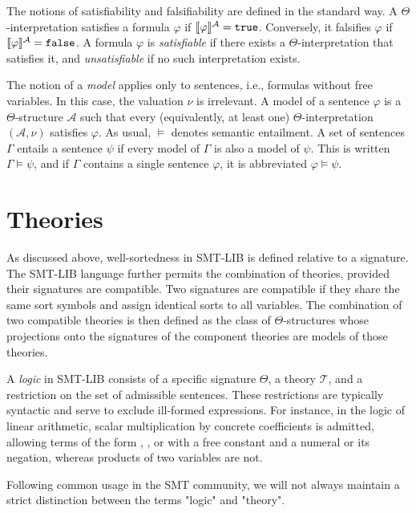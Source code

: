 The notions of satisfiability and falsifiability are defined in the standard way.
A $\Theta$-interpretation satisfies a formula $\varphi$ if $\llbracket \varphi \rrbracket^{\mathcal{A}} = \texttt{\upshape{true}}$.
Conversely, it falsifies $\varphi$ if $\llbracket \varphi \rrbracket^{\mathcal{A}} = \texttt{\upshape{false}}$.
A formula $\varphi$ is \emph{satisfiable} if there exists a $\Theta$-interpretation that satisfies it, and \emph{unsatisfiable} if no such interpretation exists.

The notion of a \emph{model} applies only to sentences, i.e., formulas without free variables.
In this case, the valuation $\nu$ is irrelevant.
A model of a sentence $\varphi$ is a $\Theta$-structure $\mathcal{A}$ such that every (equivalently, at least one) $\Theta$-interpretation $(\mathcal{A}, \nu)$ satisfies $\varphi$.
As usual, $\models$ denotes semantic entailment. A set of sentences $\Gamma$ entails a sentence $\psi$ if every model of $\Gamma$ is also a model of $\psi$.
This is written $\Gamma \models \psi$, and if $\Gamma$ contains a single sentence $\varphi$, it is abbreviated $\varphi \models \psi$.

\section{Theories}

As discussed above, well-sortedness in SMT-LIB is defined relative to a signature.
The SMT-LIB language further permits the combination of theories, provided their signatures are compatible.
Two signatures are compatible if they share the same sort symbols and assign identical sorts to all variables.
The combination of two compatible theories is then defined as the class of $\Theta$-structures whose projections onto the signatures of the component theories are models of those theories.

A \emph{logic} in SMT-LIB consists of a specific signature $\Theta$, a theory $\mathcal{T}$, and a restriction on the set of admissible sentences.
These restrictions are typically syntactic and serve to exclude ill-formed expressions.
For instance, in the logic of linear arithmetic, scalar multiplication by concrete coefficients is admitted,
allowing terms of the form , , or  with  a free constant and  a numeral or its negation,
whereas products of two variables are not.

Following common usage in the SMT community, we will not always maintain a strict distinction between the terms "logic" and "theory".

